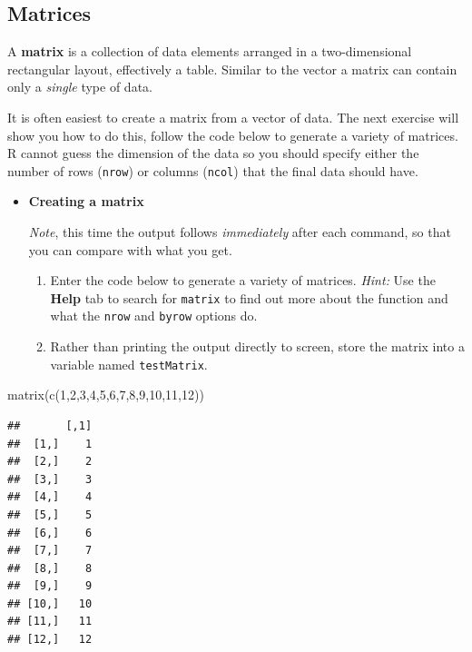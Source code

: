 \documentclass[a4paper]{book}
\newenvironment{Shaded}{}{}
\newcommand{\KeywordTok}[1]{\textcolor[rgb]{0.00,0.00,1.00}{{#1}}}
\newcommand{\DecValTok}[1]{{#1}}
\newcommand{\NormalTok}[1]{{#1}}
\newlength{\leftbarwidth}
\newlength{\leftbarsep}
\newcommand*{\leftbarcolorcmd}{\color{darkgray}}%
\renewenvironment{leftbar}{%
    \def\FrameCommand{{\leftbarcolorcmd{\vrule width \leftbarwidth\relax\hspace {\leftbarsep}}}}%
    \MakeFramed {\advance \hsize -\width \FrameRestore }%
}{%
    \endMakeFramed
}
\renewenvironment{Shaded}
{\vspace{0em}\begin{leftbar}\begin{snugshade}}
{\end{snugshade}\end{leftbar}\vspace{0pt}}
\newenvironment{rmdblock}[1]
  {\vspace{1.5em}\begin{shaded*}
  \begin{itemize}
  \renewcommand{\labelitemi}{
    \raisebox{-.7\height}[0pt][0pt]{
      {\setkeys{Gin}{width=3em,keepaspectratio}\texttt{[image: images/\#1]}}
    }
  }
  \item
  }
  {
  \end{itemize}
  \end{shaded*}
  }
\newenvironment{rmdexercise}
  {\begin{rmdblock}{exercise}}
  {\end{rmdblock}}
\begin{document}
\subsection{Matrices}\label{matrices}

A \textbf{matrix} is a collection of data elements arranged in a
two-dimensional rectangular layout, effectively a table. Similar to the
vector a matrix can contain only a \emph{single} type of data.

It is often easiest to create a matrix from a vector of data. The next
exercise will show you how to do this, follow the code below to generate
a variety of matrices. R cannot guess the dimension of the data so you
should specify either the number of rows (\texttt{nrow}) or columns
(\texttt{ncol}) that the final data should have.

\begin{rmdexercise}
\textbf{Creating a matrix}

\emph{Note}, this time the output follows \emph{immediately} after each
command, so that you can compare with what you get.

\begin{enumerate}
\def\labelenumi{\arabic{enumi}.}
\item
  Enter the code below to generate a variety of matrices. \emph{Hint:}
  Use the \textbf{Help} tab to search for \texttt{matrix} to find out
  more about the function and what the \texttt{nrow} and \texttt{byrow}
  options do.
\item
  Rather than printing the output directly to screen, store the matrix
  into a variable named \texttt{testMatrix}.
\end{enumerate}
\end{rmdexercise}

\begin{Shaded}
\begin{Highlighting}[]
\KeywordTok{matrix}\NormalTok{(}\KeywordTok{c}\NormalTok{(}\DecValTok{1}\NormalTok{,}\DecValTok{2}\NormalTok{,}\DecValTok{3}\NormalTok{,}\DecValTok{4}\NormalTok{,}\DecValTok{5}\NormalTok{,}\DecValTok{6}\NormalTok{,}\DecValTok{7}\NormalTok{,}\DecValTok{8}\NormalTok{,}\DecValTok{9}\NormalTok{,}\DecValTok{10}\NormalTok{,}\DecValTok{11}\NormalTok{,}\DecValTok{12}\NormalTok{))}
\end{Highlighting}
\end{Shaded}

\begin{verbatim}
##       [,1]
##  [1,]    1
##  [2,]    2
##  [3,]    3
##  [4,]    4
##  [5,]    5
##  [6,]    6
##  [7,]    7
##  [8,]    8
##  [9,]    9
## [10,]   10
## [11,]   11
## [12,]   12
\end{verbatim}
\end{document}
